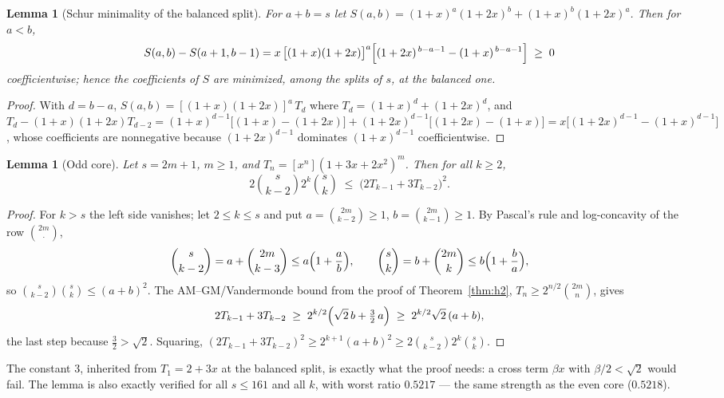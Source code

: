 \documentclass[11pt]{article}
\newtheorem{lemma}[theorem]{Lemma}
\theoremstyle{definition}
\begin{document}
\begin{lemma}[Schur minimality of the balanced
split]\label{lem:schurS}
For $a+b=s$ let $S(a,b)=(1+x)^a(1+2x)^b+(1+x)^b(1+2x)^a$.  Then for
$a<b$,
\[
  S(a,b)-S(a+1,b-1)
  =x\,\bigl[(1+x)(1+2x)\bigr]^a
  \Bigl[(1+2x)^{\,b-a-1}-(1+x)^{\,b-a-1}\Bigr]\;\ge\;0
\]
coefficientwise; hence the coefficients of $S$ are minimized, among
the splits of $s$, at the balanced one.
\end{lemma}

\begin{proof}
With $d=b-a$, $S(a,b)=[(1+x)(1+2x)]^a\,T_d$ where
$T_d=(1+x)^d+(1+2x)^d$, and
$T_d-(1+x)(1+2x)T_{d-2}
=(1+x)^{d-1}\bigl[(1+x)-(1+2x)\bigr]
+(1+2x)^{d-1}\bigl[(1+2x)-(1+x)\bigr]
=x\bigl[(1+2x)^{d-1}-(1+x)^{d-1}\bigr]$,
whose coefficients are nonnegative because $(1+2x)^{d-1}$ dominates
$(1+x)^{d-1}$ coefficientwise.
\end{proof}

\begin{lemma}[Odd core]\label{lem:oddcore}
Let $s=2m+1$, $m\ge1$, and $T_n=[x^n](1+3x+2x^2)^m$.  Then for all
$k\ge2$,
\[
  2\binom s{k-2}2^k\binom sk\;\le\;\bigl(2T_{k-1}+3T_{k-2}\bigr)^2 .
\]
\end{lemma}

\begin{proof}
For $k>s$ the left side vanishes; let $2\le k\le s$ and put
$a=\binom{2m}{k-2}\ge1$, $b=\binom{2m}{k-1}\ge1$.  By Pascal's rule
and log-concavity of the row $\binom{2m}\cdot$,
\[
  \binom s{k-2}=a+\binom{2m}{k-3}\le a\Bigl(1+\frac ab\Bigr),\qquad
  \binom sk=b+\binom{2m}k\le b\Bigl(1+\frac ba\Bigr),
\]
so $\binom s{k-2}\binom sk\le(a+b)^2$.  The AM--GM/Vandermonde bound
from the proof of Theorem~\ref{thm:h2}, $T_n\ge2^{n/2}\binom{2m}n$,
gives
\[
  2T_{k-1}+3T_{k-2}\;\ge\;2^{k/2}\Bigl(\sqrt2\,b+\tfrac32\,a\Bigr)
  \;\ge\;2^{k/2}\sqrt2\,(a+b),
\]
the last step because $\tfrac32>\sqrt2$.  Squaring,
$(2T_{k-1}+3T_{k-2})^2\ge2^{k+1}(a+b)^2
\ge2\binom s{k-2}2^k\binom sk$.
\end{proof}

The constant $3$, inherited from $T_1=2+3x$ at the balanced split, is
exactly what the proof needs: a cross term $\beta x$ with
$\beta/2<\sqrt2$ would fail.  The lemma is also exactly verified for
all $s\le161$ and all $k$, with worst ratio $0.5217$ --- the same
strength as the even core ($0.5218$).
\end{document}
